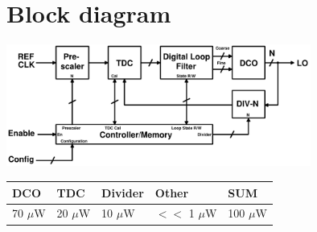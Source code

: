 \documentclass[10pt,a4paper]{article}
\begin{document}
	\section{Block diagram}
		\center\includegraphics[width=0.75\textwidth, angle=0]{figs/pll2.pdf}
		\vspace{-.1em}
		\begin{table}[htb!]
			\tiny
			\centering
			\def\arraystretch{1.5}		
			\setlength\arrayrulewidth{0.75pt}
			\setlength{\tabcolsep}{1em} %
			\begin{tabular}{|l|l|l|l|l|}
				\hline 
				\rule[-1ex]{0pt}{2.5ex} \cellcolor{gray!40}\textbf{DCO} & \cellcolor{gray!40}\textbf{TDC} & \cellcolor{gray!40}\textbf{Divider }& \cellcolor{gray!40}\textbf{Other} & \cellcolor{gray!40}\textbf{SUM} \\ 
				\hline 
				\rule[-1ex]{0pt}{2.5ex} 70 $\mu$W& 20 $\mu$W & 10 $\mu$W & $<<$ 1 $\mu$W & 100 $\mu$W\\ 
				\hline 
			\end{tabular} 
		\end{table}   
\end{document}
